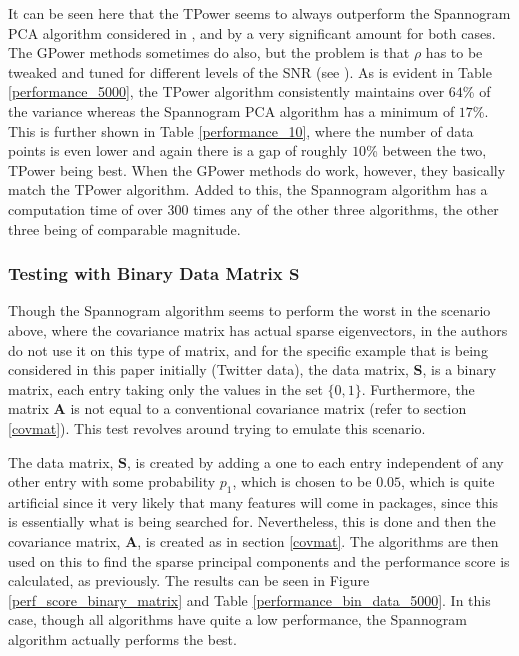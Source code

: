 \documentclass[11pt,a4paper]{article}
\newcommand{\smat}{\mathbf{S}}
\newcommand{\covmat}{\mathbf{A}}
\begin{document}
It can be seen here that the TPower seems to always outperform the Spannogram PCA algorithm considered in \cite{dimakis}, and by a very significant amount for both cases. The GPower methods sometimes do also, but the problem is that $\rho$ has to be tweaked and tuned for different levels of the SNR (see \cite{GPower}). As is evident in Table \ref{performance_5000}, the TPower algorithm consistently maintains over $64$\% of the variance whereas the Spannogram PCA algorithm has a minimum of $17$\%. This is further shown in Table \ref{performance_10}, where the number of data points is even lower and again there is a gap of roughly $10$\% between the two, TPower being best. When the GPower methods do work, however, they basically match the TPower algorithm. Added to this, the Spannogram algorithm has a computation time of over 300 times any of the other three algorithms, the other three being of comparable magnitude.

\subsubsection{Testing with Binary Data Matrix $\smat$}

Though the Spannogram algorithm seems to perform the worst in the scenario above, where the covariance matrix has actual sparse eigenvectors, in \cite{dimakis} the authors do not use it on this type of matrix, and for the specific example that is being considered in this paper initially (Twitter data), the data matrix, $\smat$, is a binary matrix, each entry taking only the values in the set $\{ 0, 1\}$. Furthermore, the matrix $\covmat$ is not equal to a conventional covariance matrix (refer to section \ref{covmat}). This test revolves around trying to emulate this scenario. 

The data matrix, $\smat$, is created by adding a one to each entry independent of any other entry with some probability $p_\text{1}$, which is chosen to be $0.05$, which is quite artificial since it very likely that many features will come in packages, since this is essentially what is being searched for. Nevertheless, this is done and then the covariance matrix, $\covmat$, is created as in section \ref{covmat}. The algorithms are then used on this to find the sparse principal components and the performance score is calculated, as previously. The results can be seen in Figure \ref{perf_score_binary_matrix} and Table \ref{performance_bin_data_5000}. In this case, though all algorithms have quite a low performance, the Spannogram algorithm actually performs the best. 
\end{document}
